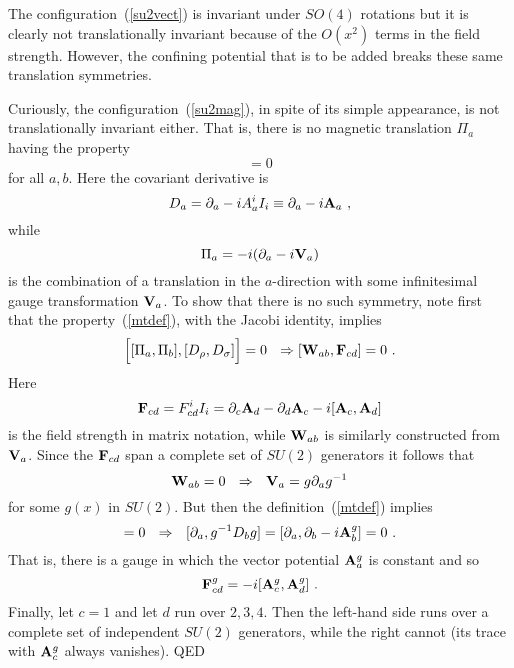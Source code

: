 \documentclass[a4paper,12pt]{article}
\begin{document}
The configuration~(\ref{su2vect}) is invariant under $SO(4)$ rotations but
it is clearly not translationally invariant because of the $O(x^2)$ terms
in the field strength.  However, the
confining potential that is to be added breaks these same
translation symmetries.  

Curiously, the configuration~(\ref{su2mag}), in spite of its simple
appearance, is not translationally invariant either.  That is, there is
no magnetic translation $\Pi_a$
having the property
\begin{equation}
[\Pi_a, D_b] = 0  \label{mtdef}
\end{equation}
for all $a,b$.
Here the covariant derivative is
\begin{equation}
D_a = \partial_a - i A_a^i I_i \equiv \partial_a - i {\bf A}_a
\ ,
\end{equation}
while 
\begin{equation}
\Pi_a = -i(\partial_a - i {\bf V}_a)
\end{equation}
is the combination of a translation in the $a$-direction with some
infinitesimal gauge transformation ${\bf V}_a$.  To show that there is
no such symmetry, note first that the property~(\ref{mtdef}), with
the Jacobi identity, implies
\begin{equation}
\Bigl[ [ \Pi_a,\Pi_b ], [D_\rho,D_\sigma] \Bigr] = 0
\ \ \Rightarrow [ {\bf W}_{ab} , {\bf F}_{cd} ] = 0\ .
\end{equation}
Here
\begin{equation}
{\bf F}_{cd} = { F}^i_{cd} I_i
= \partial_c {\bf A}_d - \partial_d {\bf A}_c 
- i [ {\bf A}_c, {\bf A}_d]
\end{equation}
is the
field strength in matrix notation, while ${\bf W}_{ab}$ is similarly
constructed from ${\bf V}_a$.  Since the ${\bf F}_{cd}$ span a
complete set of $SU(2)$ generators it follows that
\begin{equation}
{\bf W}_{ab} = 0\ \ \Rightarrow\ \ {\bf V}_a = g \partial_a g^{-1}
\end{equation}
for some $g(x)$ in $SU(2)$.  But then the definition~(\ref{mtdef}) implies
\begin{equation}
[g \partial_a g^{-1}, D_b ] = 0\ \ \Rightarrow\ \ 
[\partial_a, g^{-1} D_b g ] = [\partial_a, \partial_b
- i {\bf
A}^{g}_b ] = 0\
.
\end{equation}
That is, there is a gauge in which the vector potential ${\bf
A}^{g}_a$ is constant and so
\begin{equation}
{\bf F}^g_{cd} =
- i [ {\bf A}^g_c, {\bf A}^g_d]\ .
\end{equation}
Finally, let $c = 1$ and let $d$ run over $2,3,4$.  Then the
left-hand side runs over a complete set of independent $SU(2)$ generators,
while the right cannot (its trace with ${\bf A}^g_c$ always vanishes).
QED
\end{document}
